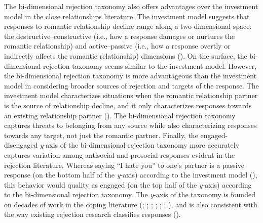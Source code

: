 \documentclass[
]{udthesis}
\begin{document}
The bi-dimensional rejection taxonomy also offers advantages over the
investment model in the close relationships literature. The investment
model suggests that responses to romantic relationship decline range
along a two-dimensional space: the destructive--constructive (i.e., how
a response damages or nurtures the romantic relationship) and
active--passive (i.e., how a response overtly or indirectly affects the
romantic relationship) dimensions (). On the
surface, the bi-dimensional rejection taxonomy seems similar to the
investment model. However, the bi-dimensional rejection taxonomy is more
advantageous than the investment model in considering broader sources of
rejection and targets of the response. The investment model
characterizes situations when the romantic relationship partner is the
source of relationship decline, and it only characterizes responses
towards an existing relationship partner ().
The bi-dimensional rejection taxonomy captures threats to belonging from
any source while also characterizing responses towards any target, not
just the romantic partner. Finally, the engaged-disengaged \emph{y}-axis of
the bi-dimensional rejection taxonomy more accurately captures variation
among antisocial and prosocial responses evident in the rejection
literature. Whereas saying ``I hate you'' to one's partner is a passive
response (on the bottom half of the \emph{y}-axis) according to the
investment model (), this behavior would
quality as engaged (on the top half of the \emph{y}-axis) according to the
bi-dimensional rejection taxonomy. The \emph{y}-axis of the taxonomy is
founded on decades of work in the coping literature
(; ; ; ; ; ; ), and is also consistent with the
way existing rejection research classifies responses
().
\end{document}
